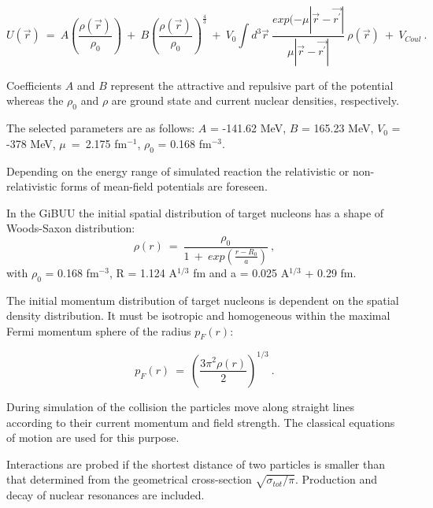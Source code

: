 \begin{equation}
U(\vec{r}) \ = \ A \left( \frac{\rho(\vec{r})}{\rho_{0}} \right ) \ + 
\ B \left( \frac{\rho(\vec{r})}{\rho_{0}} \right )^{\frac{4}{3}} \ + \ 
V_{0} \int d^{3}\vec{r} \ \frac{exp(-\mu|\vec{r} - \vec{r^{'}}|}{\mu|\vec{r} - \vec{r^{'}}|} \ \rho(\vec{r}) \ +
\ V_{Coul} \ .
\end{equation}

Coefficients $A$ and $B$ represent the attractive and repulsive part of the potential whereas the $\rho_{0}$ and $\rho$ are ground state and current nuclear densities, respectively. 

The selected parameters are as follows: $A$ = -141.62 MeV, $B$ = 165.23 MeV, $V_{0}$ = -378 MeV, 
$\mu$~=~2.175 fm$^{-1}$, $\rho_{0}$ = 0.168 fm$^{-3}$.

Depending on the energy range of simulated reaction the relativistic or non-relativistic forms of mean-field potentials are foreseen.

In the GiBUU the initial spatial distribution of target nucleons  has a shape of Woods-Saxon distribution:
\begin{equation}
\label{equ:Woods_Saxon2}
\rho(r) \ = \ \frac{\rho_{0}}{1 \ + \ exp(\frac{r - R_{0}}{a})} \ ,
\end{equation}
with $\rho_{0}$ = 0.168 fm$^{-3}$, R = 1.124 A$^{1/3}$ fm and a = 0.025 A$^{1/3}$ + 0.29 fm.

The initial momentum distribution of target nucleons is dependent 
on the spatial density distribution. It must be isotropic and homogeneous within the maximal Fermi momentum sphere of the radius $p_{F}(r)$:

\begin{equation}
p_{F}(r) \ = \ \left ( \frac{3\pi^{2}\rho(r)}{2} \right ) ^{1/3} \ .
\end{equation}

During simulation of the collision the particles move along 
straight lines according to their current momentum and field strength.
The classical equations of motion are used for this purpose. 

Interactions are probed if the shortest distance of two particles 
is smaller than that determined from the geometrical cross-section  $\sqrt{\sigma_{tot}/\pi}$. 
Production and decay of nuclear resonances are included.



